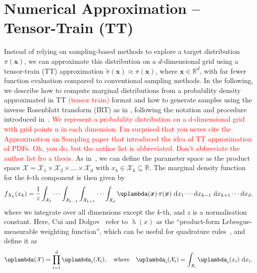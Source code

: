 \section{Numerical Approximation -- Tensor-Train (TT)}
\label{sec:tensortrain}
Instead of relying on sampling-based methods to explore a target distribution $\pi(\bm{x})$, we can approximate this distribution on a $d$-dimensional grid using a tensor-train (TT) approximation $\tilde{\pi}(\bm{x}) \approx \pi(\bm{x})$, where $\bm{x} \in \mathbb{R}^d$, with far fewer function evaluation compared to conventional sampling methods.
In the following, we describe how to compute marginal distributions from a probability density approximated in TT \textcolor{red}{ (tensor train)} format and how to generate samples using the inverse Rosenblatt transform (IRT) as in \cite{dolgov2020approximation}, following the notation and procedure introduced in~\cite{cui2022deep}.
\textcolor{red}{We represent a probability distribution on a d-dimensional grid with grid points n in each dimension.
I'm surprised that you never cite the Approximation an Sampling paper that introduced the idea of TT approximation of PDFs. Oh, you do, but the author list is abbreviated. Don't abbreviate the author list fro a thesis.}
As in~\cite{cui2022deep}, we can define the parameter space as the product space $\mathcal{X} = \mathcal{X}_1 \times \mathcal{X}_2 \times \dots \times \mathcal{X}_d$ with $ x_k \in \mathcal{X}_k \subseteq \mathbb{R}$.
The marginal density function for the $k$-th component is then given by
\begin{align}
	f_{X_k}(x_k) = \frac{1}{z} \int_{\mathcal{X}_1} \cdots \int_{\mathcal{X}_{k-1}} \int_{\mathcal{X}_{k+1}} \cdots  \int_{\mathcal{X}_d} \uplambda(\bm{x}) \, \pi(\bm{x}) \, \diff x_1 \cdots \diff x_{k-1} \, \diff x_{k+1} \cdots \diff x_d, \label{eq:margInt}
\end{align}
where we integrate over all dimensions except the $k$-th, and $z$ is a normalisation constant.
Here, Cui and Dolgov~\cite{cui2022deep} refer to $\uplambda(x)$ as the ``product-form Lebesgue-measurable weighting function'', which can be useful for quadrature rules~\cite{davis2007methods}, and define it as
\begin{align}
	\uplambda(\mathcal{X}) = \prod_{i = 1}^{d} \uplambda_i(\mathcal{X}_i), \quad \text{where} \quad \uplambda_i(\mathcal{X}_i) = \int_{\mathcal{X}_i} \uplambda_i(x_i) \, \diff x_i. \label{eq:lebesgueWeight}
\end{align}

